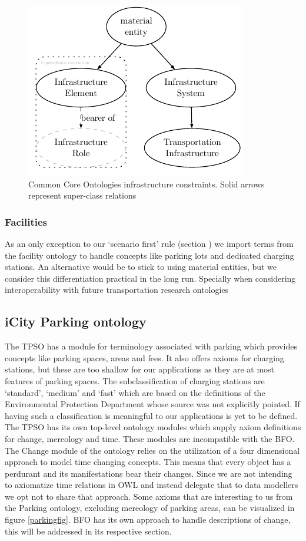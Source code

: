 \begin{figure}[h]
    \centering
    \includegraphics{images/infrastructureSystem.pdf}
    \caption{Common Core Ontologies infrastructure constraints. Solid arrows represent super-class relations}
    \label{infrastructurefigs} 
\end{figure}

\subsubsection{Facilities}

As an only exception to our `scenario first' rule (section \label{methodology})
we import terms from the facility ontology to handle concepts like parking lots
and dedicated charging stations. An alternative would be to stick to using
material entities, but we consider this differentiation practical in the long
run. Specially when considering interoperability with future transportation
research ontologies


\subsection{iCity Parking ontology}

The TPSO has a module for terminology associated with parking which provides
concepts like parking spaces, areas and fees. It also offers axioms for
charging stations, but these are too shallow for our applications as they are
at most features of parking spaces. The subclassification of charging stations
are `standard', `medium' and `fast' which are based on the definitions of the
Environmental Protection Department whose source was not explicitly pointed. If
having such a classification is meaningful to our applications is yet to be
defined. The TPSO has its own top-level ontology modules which supply axiom
definitions for change, mereology and time. These modules are incompatible with
the BFO. The Change module of the ontology relies on the utilization of a four
dimensional approach to model time changing concepts. This means that every
object has a perdurant and its manifestations bear their changes. Since we are
not intending to axiomatize time relations in OWL and instead delegate that to
data modellers we opt not to share that approach. Some axioms that are
interesting to us from the Parking ontology, excluding mereology of parking
areas, can be visualized in figure \ref{parkingfig}. BFO has its own approach
to handle descriptions of change, this will be addressed in its respective
section.

